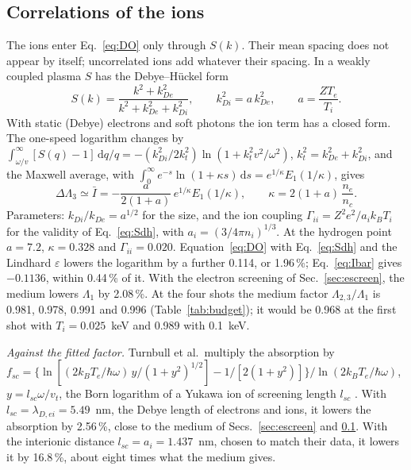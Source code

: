 \documentclass[11pt]{article}
\numberwithin{equation}{section}
\newcommand{\dd}{\mathrm d}
\newcommand{\kB}{k_B}
\begin{document}
\subsection{Correlations of the ions}
\label{sec:ions}
The ions enter Eq.~\eqref{eq:DO} only through $S(k)$. Their mean spacing does not appear
by itself; uncorrelated ions add whatever their spacing. In a weakly coupled plasma
$S$ has the Debye--H\"uckel form
\begin{equation}
S(k)=\frac{k^2+k_{De}^2}{k^2+k_{De}^2+k_{Di}^2},\qquad k_{Di}^2=a\,k_{De}^2,\qquad a=\frac{ZT_e}{T_i}.
\label{eq:Sdh}
\end{equation}
With static (Debye) electrons and soft photons the ion term has a closed form. The
one-speed logarithm changes by $\int_{\omega/v}^\infty[S(q)-1]\,\dd q/q
=-(k_{Di}^2/2k_t^2)\ln(1+k_t^2v^2/\omega^2)$, $k_t^2=k_{De}^2+k_{Di}^2$, and the
Maxwell average, with $\int_0^\infty e^{-s}\ln(1+\kappa s)\,\dd s=e^{1/\kappa}E_1(1/\kappa)$, gives
\begin{equation}
\Delta\Lambda_3\simeq\bar I=-\frac{a}{2(1+a)}\,e^{1/\kappa}E_1(1/\kappa),\qquad
\kappa=2(1+a)\,\frac{n_e}{n_c}.
\label{eq:Ibar}
\end{equation}
Parameters: $k_{Di}/k_{De}=a^{1/2}$ for the size, and the ion coupling
$\Gamma_{ii}=Z^2e^2/a_i\kB T_i$ for the validity of Eq.~\eqref{eq:Sdh}, with
$a_i=(3/4\pi n_i)^{1/3}$. At the hydrogen point $a=7.2$, $\kappa=0.328$ and
$\Gamma_{ii}=0.020$. Equation~\eqref{eq:DO} with Eq.~\eqref{eq:Sdh} and the Lindhard
$\varepsilon$ lowers the logarithm by a further 0.114, or 1.96\,\%; Eq.~\eqref{eq:Ibar}
gives $-0.1136$, within 0.44\,\% of it. With the electron screening of Sec.~\ref{sec:escreen}, the medium lowers $\Lambda_1$ by
2.08\,\%. At the four shots the medium factor $\Lambda_{2,3}/\Lambda_1$ is 0.981, 0.978,
0.991 and 0.996 (Table~\ref{tab:budget}); it would be 0.968 at the first shot with
$T_i=0.025$~keV and 0.989 with 0.1~keV.

{\noindent}\emph{Against the fitted factor.} Turnbull et al.\ multiply the absorption by
$f_{sc}=\{\ln[(2\kB T_e/\hbar\omega)\,y/(1+y^2)^{1/2}]-1/[2(1+y^2)]\}/\ln(2\kB T_e/\hbar\omega)$,
$y=l_{sc}\omega/v_t$, the Born logarithm of a Yukawa ion of screening length $l_{sc}$
\cite{Turnbull2023}. With $l_{sc}=\lambda_{D,ei}=5.49$~nm, the Debye length of electrons
and ions, it lowers the absorption by 2.56\,\%, close to the medium of Secs.~\ref{sec:escreen} and \ref{sec:ions}. With the interionic
distance $l_{sc}=a_i=1.437$~nm, chosen to match their data, it lowers it by 16.8\,\%,
about eight times what the medium gives.
\end{document}
